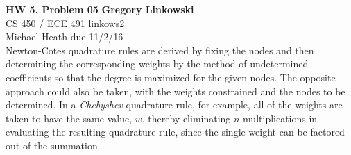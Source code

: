 \documentclass[12pt]{article}
\begin{document}
\noindent
\large\textbf{HW 5, Problem 05} \hfill \textbf{Gregory Linkowski} \\
\normalsize CS 450 / ECE 491 \hfill linkows2 \\
Michael Heath \hfill due 11/2/16 \\


\vspace{5mm}
Newton-Cotes quadrature rules are derived by fixing the nodes and then determining the corresponding weights by the method of undetermined coefficients so that the degree is maximized for the given nodes. The opposite approach could also be taken, with the weights constrained and the nodes to be determined. In a \textit{Chebyshev} quadrature rule, for example, all of the weights are taken to have the same value, $w$, thereby eliminating $n$ multiplications in evaluating the resulting quadrature rule, since the single weight can be factored out of the summation.
\vspace{-2mm} \\
\end{document}
